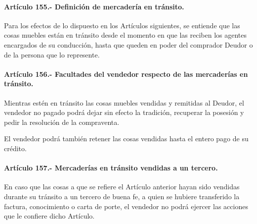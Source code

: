 \documentclass[
]{book}
\begin{document}
\hypertarget{artuxedculo-155.--definiciuxf3n-de-mercaderuxeda-en-truxe1nsito.}{%
\paragraph*{Artículo 155.- Definición de mercadería en tránsito.}\label{artuxedculo-155.--definiciuxf3n-de-mercaderuxeda-en-truxe1nsito.}}

Para los efectos de lo dispuesto en los Artículos siguientes, se entiende que las cosas muebles están en tránsito desde el momento en que las reciben los agentes encargados de su conducción, hasta que queden en poder del comprador Deudor o de la persona que lo represente.

\hypertarget{artuxedculo-156.--facultades-del-vendedor-respecto-de-las-mercaderuxedas-en-truxe1nsito.}{%
\paragraph*{Artículo 156.- Facultades del vendedor respecto de las mercaderías en tránsito.}\label{artuxedculo-156.--facultades-del-vendedor-respecto-de-las-mercaderuxedas-en-truxe1nsito.}}

Mientras estén en tránsito las cosas muebles vendidas y remitidas al Deudor, el vendedor no pagado podrá dejar sin efecto la tradición, recuperar la posesión y pedir la resolución de la compraventa.

El vendedor podrá también retener las cosas vendidas hasta el entero pago de su crédito.

\hypertarget{artuxedculo-157.--mercaderuxedas-en-truxe1nsito-vendidas-a-un-tercero.}{%
\paragraph*{Artículo 157.- Mercaderías en tránsito vendidas a un tercero.}\label{artuxedculo-157.--mercaderuxedas-en-truxe1nsito-vendidas-a-un-tercero.}}

En caso que las cosas a que se refiere el Artículo anterior hayan sido vendidas durante su tránsito a un tercero de buena fe, a quien se hubiere transferido la factura, conocimiento o carta de porte, el vendedor no podrá ejercer las acciones que le confiere dicho Artículo.
\end{document}
